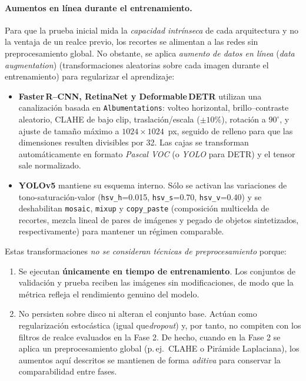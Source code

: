 \paragraph{Aumentos en línea durante el entrenamiento.}
Para que la prueba inicial mida la \textit{capacidad intrínseca} de cada arquitectura y no la ventaja de un realce previo, los recortes se alimentan a las redes sin preprocesamiento global.
No obstante, se aplica \emph{aumento de datos en línea} (\textit{data augmentation}) (transformaciones aleatorias sobre cada imagen durante el entrenamiento) para regularizar el aprendizaje:

\begin{itemize}
    \item \textbf{Faster\,R--CNN, RetinaNet y Deformable\,DETR} utilizan una canalización basada en \texttt{Albumentations}:
    volteo horizontal, brillo–contraste aleatorio, CLAHE de bajo clip, traslación/escala (\(\pm 10\%\)), rotación a \(90^{\circ}\),
    y ajuste de tamaño máximo a \(1024\times1024\)~px, seguido de relleno para que las dimensiones resulten divisibles por 32.
    Las cajas se transforman automáticamente en formato \textit{Pascal VOC} (o \textit{YOLO} para DETR) y el tensor sale normalizado.
    \item \textbf{YOLOv5} mantiene su esquema interno.
    Sólo se activan las variaciones de tono-saturación-valor (\texttt{hsv\_h}=0.015, \texttt{hsv\_s}=0.70, \texttt{hsv\_v}=0.40) y se deshabilitan \texttt{mosaic}, \texttt{mixup} y \texttt{copy\_paste} (composición multicelda de recortes, mezcla lineal de pares de imágenes y pegado de objetos sintetizados, respectivamente) para mantener un régimen comparable.
\end{itemize}

Estas transformaciones \emph{no se consideran técnicas de preprocesamiento} porque:

\begin{enumerate}
    \item Se ejecutan \textbf{únicamente en tiempo de entrenamiento}.
    Los conjuntos de validación y prueba reciben las imágenes sin modificaciones, de modo que la métrica refleja el rendimiento genuino del modelo.
    \item No persisten sobre disco ni alteran el conjunto base.
    Actúan como regularización estocástica (igual que\textit{dropout}) y, por tanto, no compiten con los filtros de realce evaluados en la Fase 2.
    De hecho, cuando en la Fase 2 se aplica un preprocesamiento global (p.\,ej.\ CLAHE o Pirámide Laplaciana), los aumentos aquí descritos se mantienen de forma \textit{aditiva} para conservar la comparabilidad entre fases.
\end{enumerate}

